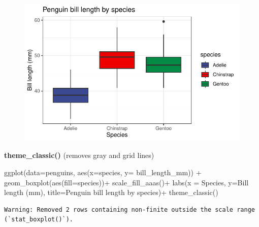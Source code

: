 \documentclass[
  letterpaper,
  DIV=11,
  numbers=noendperiod]{scrartcl}
\newenvironment{Shaded}{\begin{snugshade}}{\end{snugshade}}
\newcommand{\AttributeTok}[1]{\textcolor[rgb]{0.40,0.45,0.13}{#1}}
\newcommand{\FunctionTok}[1]{\textcolor[rgb]{0.28,0.35,0.67}{#1}}
\newcommand{\NormalTok}[1]{\textcolor[rgb]{0.00,0.23,0.31}{#1}}
\newcommand{\SpecialCharTok}[1]{\textcolor[rgb]{0.37,0.37,0.37}{#1}}
\newcommand{\StringTok}[1]{\textcolor[rgb]{0.13,0.47,0.30}{#1}}
\begin{document}
\begin{figure}[H]

{\centering \includegraphics{Lab_2_files/figure-pdf/unnamed-chunk-42-1.pdf}

}

\end{figure}

\textbf{theme\_classic()} (removes gray and grid lines)

\begin{Shaded}
\begin{Highlighting}[]
\FunctionTok{ggplot}\NormalTok{(}\AttributeTok{data=}\NormalTok{penguins, }\FunctionTok{aes}\NormalTok{(}\AttributeTok{x=}\NormalTok{species, }\AttributeTok{y=}\NormalTok{ bill\_length\_mm)) }\SpecialCharTok{+}
  \FunctionTok{geom\_boxplot}\NormalTok{(}\FunctionTok{aes}\NormalTok{(}\AttributeTok{fill=}\NormalTok{species))}\SpecialCharTok{+}
  \FunctionTok{scale\_fill\_aaas}\NormalTok{()}\SpecialCharTok{+}
  \FunctionTok{labs}\NormalTok{(}\AttributeTok{x =} \StringTok{\textquotesingle{}Species\textquotesingle{}}\NormalTok{, }\AttributeTok{y=}\StringTok{\textquotesingle{}Bill length (mm)\textquotesingle{}}\NormalTok{, }\AttributeTok{title=}\StringTok{\textquotesingle{}Penguin bill length by species\textquotesingle{}}\NormalTok{)}\SpecialCharTok{+}
  \FunctionTok{theme\_classic}\NormalTok{()}
\end{Highlighting}
\end{Shaded}

\begin{verbatim}
Warning: Removed 2 rows containing non-finite outside the scale range
(`stat_boxplot()`).
\end{verbatim}
\end{document}
